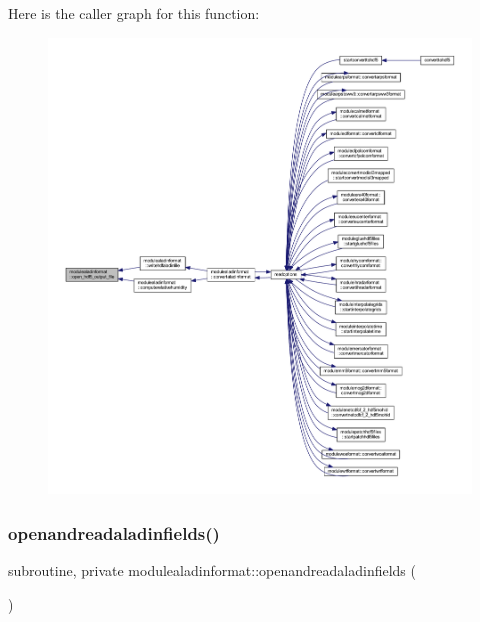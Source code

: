 Here is the caller graph for this function\+:\nopagebreak
\begin{figure}[H]
\begin{center}
\leavevmode
\includegraphics[width=350pt]{namespacemodulealadinformat_a554b3cf12b5ecedce22b2e607f931c70_icgraph}
\end{center}
\end{figure}
\mbox{\label{namespacemodulealadinformat_a2b65697a3c42c8dc546ebf63e260e98f}} 
\subsubsection{\texorpdfstring{openandreadaladinfields()}{openandreadaladinfields()}}
{\footnotesize\ttfamily subroutine, private modulealadinformat\+::openandreadaladinfields (\begin{DoxyParamCaption}{ }\end{DoxyParamCaption})\hspace{0.3cm}{\ttfamily [private]}}

